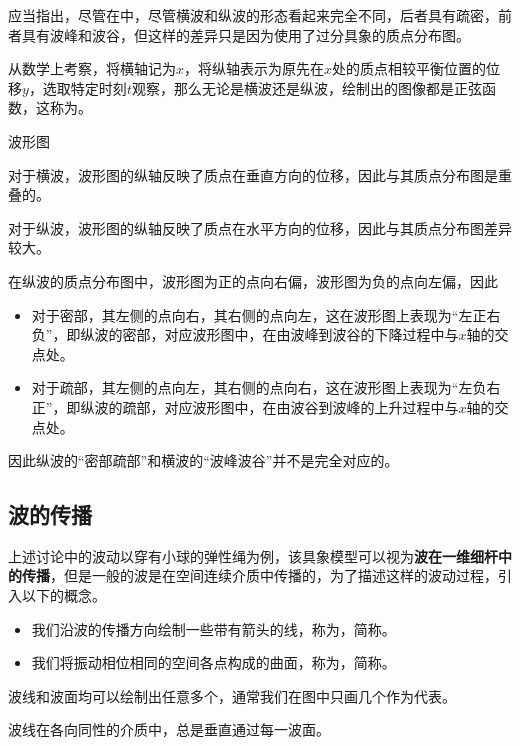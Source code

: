 应当指出，尽管在中，尽管横波和纵波的形态看起来完全不同，后者具有疏密，前者具有波峰和波谷，但这样的差异只是因为使用了过分具象的质点分布图。

从数学上考察，将横轴记为$x$，将纵轴表示为原先在$x$处的质点相较平衡位置的位移$y$，选取特定时刻$t$观察，那么无论是横波还是纵波，绘制出的图像都是正弦函数，这称为。
\begin{Figure}{波形图}
\end{Figure}

对于横波，波形图的纵轴反映了质点在垂直方向的位移，因此与其质点分布图是重叠的。

对于纵波，波形图的纵轴反映了质点在水平方向的位移，因此与其质点分布图差异较大。

在纵波的质点分布图中，波形图为正的点向右偏，波形图为负的点向左偏，因此
\begin{itemize}
    \item 对于密部，其左侧的点向右，其右侧的点向左，这在波形图上表现为“左正右负”，即纵波的密部，对应波形图中，在由波峰到波谷的下降过程中与$x$轴的交点处。
    \item 对于疏部，其左侧的点向左，其右侧的点向右，这在波形图上表现为“左负右正”，即纵波的疏部，对应波形图中，在由波谷到波峰的上升过程中与$x$轴的交点处。
\end{itemize}
因此纵波的“密部疏部”和横波的“波峰波谷”并不是完全对应的。

\subsection{波的传播}
上述讨论中的波动以穿有小球的弹性绳为例，该具象模型可以视为\textbf{波在一维细杆中的传播}，但是一般的波是在空间连续介质中传播的，为了描述这样的波动过程，引入以下的概念。
\begin{itemize}
    \item 我们沿波的传播方向绘制一些带有箭头的线，称为，简称。

    \item 我们将振动相位相同的空间各点构成的曲面，称为，简称。
\end{itemize}
波线和波面均可以绘制出任意多个，通常我们在图中只画几个作为代表。

波线在各向同性的介质中，总是垂直通过每一波面。

